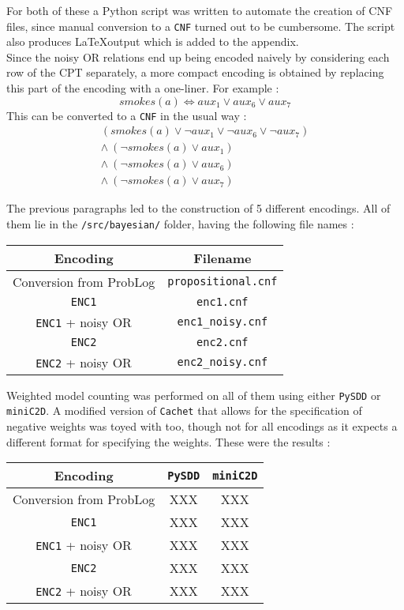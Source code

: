 \begin{multicols*}{2}
\noindent For both of these a Python script was written to automate the creation of CNF files, since manual conversion to a \texttt{CNF} turned out to be cumbersome. The script also produces \LaTeX output which is added to the appendix.\\

\noindent Since the noisy OR relations end up being encoded naively by considering each row of the CPT separately, a more compact encoding is obtained by replacing this part of the encoding with a one-liner. For example :
$$smokes(a)\Leftrightarrow aux_1 \lor aux_6 \lor aux_7$$
\noindent This can be converted to a \texttt{CNF} in the usual way :
\begin{gather*}
(smokes(a) \lor \lnot aux_1\lor\lnot aux_6\lor\lnot aux_7)\\
\land\ (\lnot smokes(a) \lor aux_1)\\
\land\ (\lnot smokes(a) \lor aux_6)\\
\land\ (\lnot smokes(a) \lor aux_7)
\end{gather*}



The previous paragraphs led to the construction of 5 different encodings. All of them lie in the \texttt{/src/bayesian/} folder, having the following file names :
\begin{center}
\begin{tabular}{cc}
Encoding & Filename \\\hline
Conversion from ProbLog & \texttt{propositional.cnf}\\
\texttt{ENC1} & \texttt{enc1.cnf}\\
\texttt{ENC1} + noisy OR & \texttt{enc1\_noisy.cnf}\\
\texttt{ENC2} & \texttt{enc2.cnf}\\
\texttt{ENC2} + noisy OR & \texttt{enc2\_noisy.cnf}\\
\end{tabular}
\end{center}
\noindent Weighted model counting was performed on all of them using either \texttt{PySDD} or \texttt{miniC2D}. A modified version of \texttt{Cachet} that allows for the specification of negative weights was toyed with too, though not for all encodings as it expects a different format for specifying the weights. These were the results :
\begin{center}
\begin{tabular}{c|cc}
Encoding & \texttt{PySDD} & \texttt{miniC2D} \\\hline
Conversion from ProbLog & XXX & XXX\\
\texttt{ENC1} & XXX & XXX\\
\texttt{ENC1} + noisy OR & XXX & XXX\\
\texttt{ENC2} & XXX & XXX\\
\texttt{ENC2} + noisy OR & XXX & XXX\\
\end{tabular}
\end{center}


\end{multicols*}
